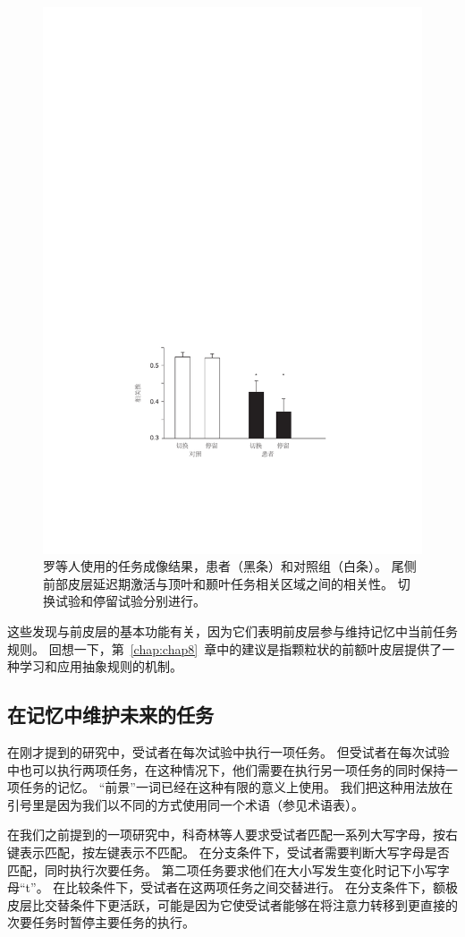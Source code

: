 \begin{figure}[!htb]
	\centering
	\includegraphics[width=0.5\linewidth]{chap9/9_6}
	\caption{罗等人使用的任务成像结果，患者（黑条）和对照组（白条）。
		尾侧前部皮层延迟期激活与顶叶和颞叶任务相关区域之间的相关性。
		切换试验和停留试验分别进行\cite{rowe2007prefrontal}。\label{fig:fig_9_6}}
\end{figure}

\par

这些发现与前皮层的基本功能有关，因为它们表明前皮层参与维持记忆中当前任务规则。
回想一下，第~\ref{chap:chap8}~章中的建议是指颗粒状的前额叶皮层提供了一种学习和应用抽象规则的机制。



\subsection{在记忆中维护未来的任务}
\par

在刚才提到的研究中，受试者在每次试验中执行一项任务。
但受试者在每次试验中也可以执行两项任务，在这种情况下，他们需要在执行另一项任务的同时保持一项任务的记忆。
“前景”一词已经在这种有限的意义上使用\cite{burgess2000cognitive}。
我们把这种用法放在引号里是因为我们以不同的方式使用同一个术语（参见术语表）。
\par


在我们之前提到的一项研究中，科奇林等人\cite{koechlin1999role}要求受试者匹配一系列大写字母，按右键表示匹配，按左键表示不匹配。
在分支条件下，受试者需要判断大写字母是否匹配，同时执行次要任务。
第二项任务要求他们在大小写发生变化时记下小写字母“t”。
在比较条件下，受试者在这两项任务之间交替进行。
在分支条件下，额极皮层比交替条件下更活跃，可能是因为它使受试者能够在将注意力转移到更直接的次要任务时暂停主要任务的执行。
\par


